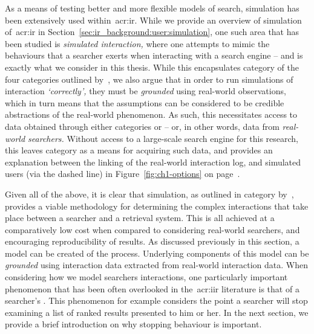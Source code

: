 As a means of testing better and more flexible models of search, simulation has been extensively used within~\gls{acr:ir}. While we provide an overview of simulation of~\gls{acr:ir} in Section~\ref{sec:ir_background:user:simulation}, one such area that has been studied is \emph{simulated interaction,} where one attempts to mimic the behaviours that a searcher exerts when interacting with a search engine -- and is exactly what we consider in this thesis. While this encapsulates category  of the four categories outlined by~\cite{keskustalo2008user_simulation}, we also argue that in order to run simulations of interaction \emph{`correctly',} they must be \emph{grounded} using real-world observations, which in turn means that the assumptions can be considered to be credible abstractions of the real-world phenomenon. As such, this necessitates access to data obtained through either categories  or  -- or, in other words, data from \emph{real-world searchers.} Without access to a large-scale search engine for this research, this leaves category  as a means for acquiring such data, and provides an explanation between the linking of the real-world interaction log, and simulated users (via the dashed line) in Figure~\ref{fig:ch1-options} on page~\pageref{fig:ch1-options}.

\noindent
{} Given all of the above, it is clear that simulation, as outlined in category  by~\cite{keskustalo2008user_simulation}, provides a viable methodology for determining the complex interactions that take place between a searcher and a retrieval system. This is all achieved at a comparatively low cost when compared to considering real-world searchers, and encouraging reproducibility of results. As discussed previously in this section, a model can be created of the process. Underlying components of this model can be \emph{grounded} using interaction data extracted from real-world interaction data. When considering how we model searchers interactions, one particularly important phenomenon that has been often overlooked in the~\gls{acr:iir} literature is that of a searcher's . This phenomenon for example considers the point a searcher will stop examining a list of ranked results presented to him or her. In the next section, we provide a brief introduction on why stopping behaviour is important.

